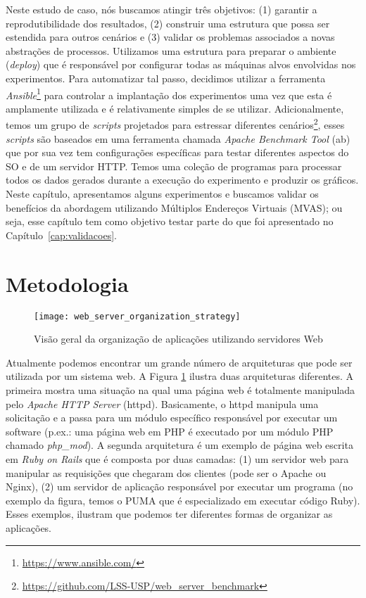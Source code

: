 \label{cap:estudo-de-caso}

Neste estudo de caso, nós buscamos atingir três objetivos: (1) garantir a
reprodutibilidade dos resultados, (2) construir uma estrutura que possa ser
estendida para outros cenários e (3) validar os problemas associados a novas
abstrações de processos. Utilizamos uma estrutura para preparar o ambiente
(\emph{deploy}) que é responsável por configurar todas as máquinas alvos
envolvidas nos experimentos. Para automatizar tal passo, decidimos utilizar a
ferramenta \emph{Ansible}\footnote{\url{https://www.ansible.com/}} para
controlar a implantação dos experimentos uma vez que esta é amplamente
utilizada e é relativamente simples de se utilizar. Adicionalmente, temos um
grupo de \emph{scripts} projetados para estressar diferentes
cenários\footnote{\url{https://github.com/LSS-USP/web_server_benchmark}}, esses
\emph{scripts} são baseados em uma ferramenta chamada \emph{Apache Benchmark
Tool} (ab) que por sua vez tem configurações específicas para testar diferentes
aspectos do SO e de um servidor HTTP. Temos uma coleção de programas para
processar todos os dados gerados durante a execução do experimento e produzir
os gráficos. Neste capítulo, apresentamos alguns experimentos e buscamos
validar os benefícios da abordagem utilizando Múltiplos Endereços Virtuais
(MVAS); ou seja, esse capítulo tem como objetivo testar parte do que foi
apresentado no Capítulo~\ref{cap:validacoes}.

\section{Metodologia} \label{sec:metodologia}

\begin{figure}[!h] \centering
  \texttt{[image: web\_server\_organization\_strategy]}
  \caption{Visão geral da organização de aplicações utilizando servidores Web}
\label{fig:web_server} \end{figure}

Atualmente podemos encontrar um grande número de arquiteturas que pode ser
utilizada por um sistema web. A Figura \ref{fig:web_server} ilustra duas
arquiteturas diferentes. A primeira mostra uma situação na qual uma página web
é totalmente manipulada pelo \emph{Apache HTTP Server} (httpd). Basicamente, o httpd manipula uma
solicitação e a passa para um módulo específico responsável por executar um
software (p.ex.: uma página web em PHP é executado por um módulo PHP chamado
\emph{php\_mod}). A segunda arquitetura é um exemplo de página web escrita em
\emph{Ruby on Rails} que é composta por duas camadas: (1) um servidor web para
manipular as requisições que chegaram dos clientes (pode ser o Apache ou
Nginx), (2) um servidor de aplicação responsável por executar um programa (no
exemplo da figura, temos o PUMA que é especializado em executar código Ruby).
Esses exemplos, ilustram que podemos ter diferentes formas de organizar as
aplicações.

